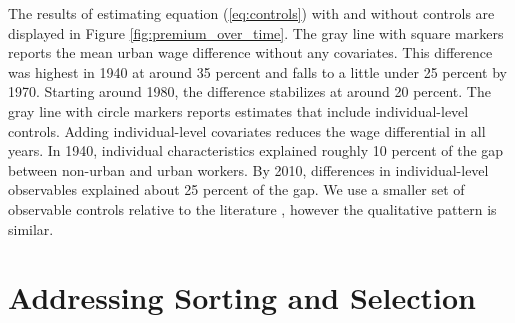 \documentclass[12pt]{article}
\begin{document}
The results of estimating equation (\ref{eq:controls}) with and without controls are displayed in Figure \ref{fig:premium_over_time}.
The gray line with square markers reports the mean urban wage difference without any covariates.
This difference was highest in 1940 at around 35 percent and falls to a little under 25 percent by 1970.
Starting around 1980, the difference stabilizes at around 20 percent.
The gray line with circle markers reports estimates that include individual-level controls.
Adding individual-level covariates reduces the wage differential in all years.
In 1940, individual characteristics explained roughly 10 percent of the gap between non-urban and urban workers.
By 2010, differences in individual-level observables explained about 25 percent of the gap.
We use a smaller set of observable controls relative to the literature \citep[e.g.,][]{Yankow_2006,Glaeser_Mare_2001}, however the qualitative pattern is similar.


\section{Addressing Sorting and Selection}\label{sec:sorting}
\end{document}
